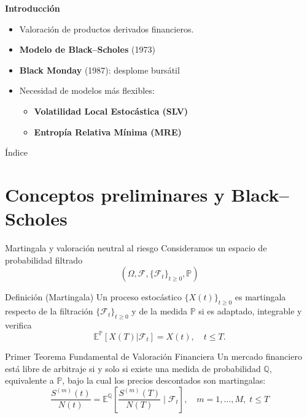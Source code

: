 \documentclass[8pt]{beamer}
\begin{document}
\begin{Large}
\begin{frame}{\bf {\LARGE {Introducción}}}
\begin{itemize}
    \item Valoración de productos derivados financieros.
    \pause
    \item {\bf Modelo de Black--Scholes} (1973)
    \pause
    \item {\bf Black Monday} (1987): desplome bursátil 
    \pause
    \item Necesidad de modelos más flexibles:
    \vspace{0.2cm}
    \begin{itemize}
        \item {\large \bf Volatilidad Local Estocástica (SLV)}
        \item {\large \bf Entropía Relativa Mínima (MRE)}
    \end{itemize}
\end{itemize}
\end{frame}
\end{Large}

\begin{frame}{Índice}
    \begin{Large}
\tableofcontents
\end{Large}
\end{frame}


\section{Conceptos preliminares y Black--Scholes}

\begin{frame}{Martingala y valoración neutral al riesgo}
    Consideramos un espacio de probabilidad filtrado
    \[
    (\Omega , \mathcal{F},\{\mathcal{F}_t\}_{t\geq 0}, \mathbb{P})
    \]
    \pause
  \begin{block}{Definición (Martingala)}
    Un proceso estocástico $\{X(t)\}_{t \geq 0}$ es martingala respecto de la filtración $\{\mathcal F_t\}_{t\geq 0}$ y de la medida $\mathbb P$ si es adaptado, integrable y verifica
    \[
        \mathbb{E}^\mathbb{P}[X(T) | \mathcal{F}_t] = X(t), \quad t \leq T. 
    \]
  \end{block}
  \pause

  \begin{block}{Primer Teorema Fundamental de Valoración Financiera}
    Un mercado financiero está libre de arbitraje si y solo si existe una medida de probabilidad $\mathbb Q$, equivalente a $\mathbb{P}$, bajo la cual los precios descontados son martingalas:
    \[
        \frac{S^{(m)}(t)}{N(t)} = \mathbb{E}^\mathbb{Q}\left[ \frac{S^{(m)}(T)}{N(T)} \mid \mathcal{F}_t \right], \quad m = 1, \dots, M, \; t \leq T
    \]
  \end{block}
  
\end{frame}
\end{document}
